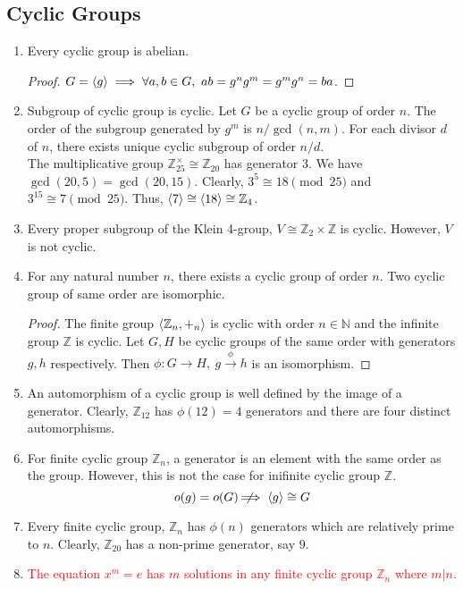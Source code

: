 \subsection{Cyclic Groups}
\begin{enumerate}
	\item Every cyclic group is abelian.
	\begin{proof}
		$G = \left\langle g \right\rangle \implies \forall a,b \in G,\ ab = g^ng^m = g^mg^n = ba$.
	\end{proof}
	\item Subgroup of cyclic group is cyclic. Let $G$ be a cyclic group of order $n$. The order of the subgroup generated by $g^m$ is $n/\gcd(n,m)$. For each divisor $d$ of $n$, there exists unique cyclic subgroup of order $n/d$.\\

	The multiplicative group $\mathbb{Z}_{25}^\times \cong \mathbb{Z}_{20}$ has generator $3$.
	We have $\gcd(20,5) = \gcd(20,15)$.
	Clearly, $3^5 \cong 18 \pmod{25}$ and $3^{15} \cong 7 \pmod{25}$. Thus, $\left\langle 7 \right\rangle \cong \left\langle 18 \right\rangle \cong \mathbb{Z}_4$.
	\item Every proper subgroup of the Klein 4-group, $V \cong \mathbb{Z}_2 \times \mathbb{Z}$ is cyclic. However, $V$ is not cyclic.
	\item For any natural number $n$, there exists a cyclic group of order $n$. Two cyclic group of same order are isomorphic.
	\begin{proof}
		The finite group $\left\langle \mathbb{Z}_n,+_n \right\rangle$ is cyclic with order $n \in \mathbb{N}$ and the infinite group $\mathbb{Z}$ is cyclic.
		Let $G,H$ be cyclic groups of the same order with generators $g,h$ respectively.
		Then $\phi : G \to H,\ g \overset{\phi}{\to} h$ is an isomorphism.
	\end{proof}
	\item An automorphism of a cyclic group is well defined by the image of a generator.
		Clearly, $\mathbb{Z}_{12}$ has $\phi(12)=4$ generators and there are four distinct automorphisms.
	\item For finite cyclic group $\mathbb{Z}_n$, a generator is an element with the same order as the group. However, this is not the case for inifinite cyclic group $\mathbb{Z}$.
		$$o(g) = o(G) \;\not\nobreak\!\!\!\!\implies \left\langle g \right\rangle \cong G$$
	\item Every finite cyclic group, $\mathbb{Z}_n$ has $\phi(n)$ generators which are relatively prime to $n$.
	Clearly, $\mathbb{Z}_{20}$ has a non-prime generator, say $9$.
	\item \textcolor{red}{The equation $x^m = e$ has $m$ solutions in any finite cyclic group $\mathbb{Z}_n$ where $m|n$.}

\end{enumerate}
